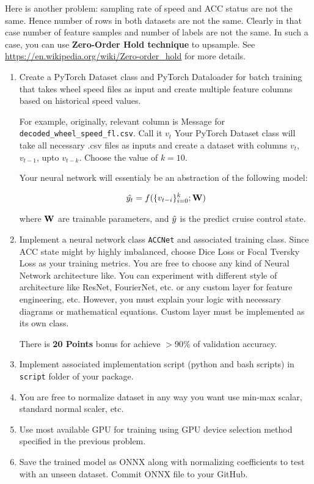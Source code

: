 \documentclass[12pt, xcolor=dvipsnames,svgnames,x11names]{article}
\begin{document}
Here is another problem: sampling rate of speed and ACC status are not the same. Hence number of rows in both datasets are not the same. Clearly in that case number of feature samples and number of labels are not the same. In such a case, you can use \textbf{Zero-Order Hold technique} to upsample. See \url{https://en.wikipedia.org/wiki/Zero-order_hold} for more details.


\begin{enumerate}
\item Create a PyTorch Dataset class and PyTorch Dataloader for batch training that takes wheel speed files as input and create multiple feature columns based on historical speed values.

For example, originally, relevant column is Message for \texttt{decoded\_wheel\_speed\_fl.csv}. Call it $v_t$  Your PyTorch Dataset class will take all necessary .csv files as inputs and create a dataset with columns $v_t$, $v_{t-1}$, upto $v_{t-k}$. Choose the value of $k = 10$.

Your neural network will essentialy be an abstraction of the following model:

\begin{align*}
\hat{y_t} = f(\{v_{t-i}\}_{i=0}^k; {\mathbf W})
\end{align*}

where ${\mathbf W}$ are trainable parameters, and ${\hat y}$ is the predict cruise control state.


\item Implement a neural network class \texttt{ACCNet} and associated training class. Since ACC state might by highly imbalanced, choose Dice Loss or Focal Tversky Loss as your training metrics. You are free to choose any kind of Neural Network architecture like. You can experiment with different style of architecture like ResNet, FourierNet, etc. or any custom layer for feature engineering, etc. However, you must explain your logic with necessary diagrams or mathematical equations. Custom layer must be implemented as its own class.

There is \textbf{20 Points} bonus for achieve $>90\%$ of validation accuracy.

\item Implement associated implementation script (python and bash scripts) in \texttt{script} folder of your package.

\item You are free to normalize dataset in any way you want use min-max scalar, standard normal scaler, etc.

\item Use most available GPU for training using GPU device selection method specified in the previous problem.

\item Save the trained model as ONNX along with normalizing coefficients to test with an unseen dataset. Commit ONNX file to your GitHub.


\end{enumerate}
\end{document}
